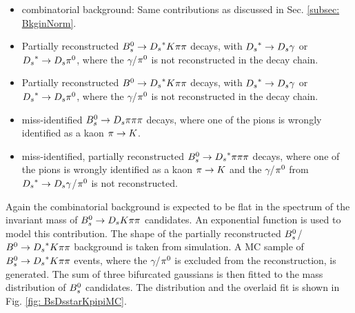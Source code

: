 \begin{itemize}

\item combinatorial background: Same contributions as discussed in Sec. \ref{subsec: BkginNorm}.

\item Partially reconstructed ${{B}^0_{s}}\rightarrow{\ensuremath{{D}_{s}}}^{*}{K}{\pi}{\pi}$ decays, with ${{D}_{s}}^{*}\rightarrow{\ensuremath{{D}_{s}}}\gamma$ or ${{D}_{s}}^{*}\rightarrow{\ensuremath{{D}_{s}}}{\ensuremath{{\pi}^0}}$, where the $\gamma$/${{\pi}^0}$ is not reconstructed in the decay chain. 

\item Partially reconstructed ${{B}^0}\rightarrow{\ensuremath{{D}_{s}}}^{*}{K}{\pi}{\pi}$ decays, with ${{D}_{s}}^{*}\rightarrow{\ensuremath{{D}_{s}}}\gamma$ or ${{D}_{s}}^{*}\rightarrow{\ensuremath{{D}_{s}}}{\ensuremath{{\pi}^0}}$, where the $\gamma$/${{\pi}^0}$ is not reconstructed in the decay chain.

\item miss-identified ${{B}^0_{s}}\rightarrow{\ensuremath{{D}_{s}}}{\ensuremath{\pi}}{\ensuremath{\pi}}{\ensuremath{\pi}}$ decays, where one of the pions is wrongly identified as a kaon ${\pi}\rightarrow{\ensuremath{K}}$.  

\item miss-identified, partially reconstructed ${{B}^0_{s}}\rightarrow{\ensuremath{{D}_{s}}}^{*}{\pi}{\pi}{\pi}$ decays, where one of the pions is wrongly identified as a kaon ${\pi}\rightarrow{\ensuremath{K}}$ and the $\gamma$/${{\pi}^0}$ from ${{D}_{s}}^{*}\rightarrow{\ensuremath{{D}_{s}}}\gamma$/${{\pi}^0}$ is 
not reconstructed.

\end{itemize}

Again the combinatorial background is expected to be flat in the spectrum of the invariant mass of ${{B}^0_{s}}\rightarrow{\ensuremath{{D}_{s}}}{\ensuremath{K}}{\ensuremath{\pi}}{\ensuremath{\pi}}$ candidates. An exponential function is used to model this contribution.\newline
The shape of the partially reconstructed ${{B}^0_{s}}$/${{B}^0}\rightarrow{\ensuremath{{D}_{s}}}^{*}{K}{\pi}{\pi}$ background is taken from simulation. 
A MC sample of ${{B}^0_{s}}\rightarrow{\ensuremath{{D}_{s}}}^{*}{K}{\pi}{\pi}$ events, where the $\gamma$/${{\pi}^0}$ is excluded from the reconstruction, is generated. 
The sum of three bifurcated gaussians is then fitted to the mass distribution of ${{B}^0_{s}}$ candidates. The distribution and the overlaid fit is shown in Fig. \ref{fig: BsDsstarKpipiMC}.  

